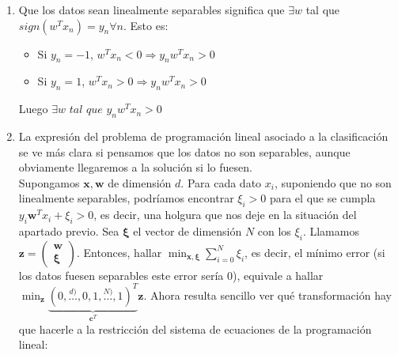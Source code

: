 \documentclass[11pt,leqno]{article}
\theoremstyle{definition}
\begin{document}
\begin{solucion} $\ $
\begin{enumerate}[a]
\item Que los datos sean linealmente separables significa que $\exists w$ tal que $sign(w^T x_n) = y_n \forall n$. Esto es:
\begin{itemize}
\item Si $y_n=-1$, $w^T x_n < 0 \Rightarrow y_n w^T x_n > 0$
\item Si $y_n= 1$, $w^T x_n > 0 \Rightarrow y_n w^T x_n > 0$
\end{itemize} 
Luego $\exists w \textit{ tal que } y_n w^T x_n > 0$

\item La expresión del problema de programación lineal asociado a la clasificación se ve más clara si pensamos que los datos no son separables, aunque obviamente llegaremos a la solución si lo fuesen.\\
Supongamos $\mathbf{x}, \mathbf{w}$ de dimensión $d$. Para cada dato $x_i$, suponiendo que no son linealmente separables, podríamos encontrar $\xi_i>0$ para el que se cumpla $y_i \mathbf{w}^T x_i + \xi_i>0$, es decir, una holgura que nos deje en la situación del apartado previo.
Sea $\mathbf{\xi}$ el vector de dimensión $N$ con los $\xi_i$. 
Llamamos $\mathbf{z} = \left( \begin{array}{c} \mathbf{w} \\ \mathbf{\xi} \end{array}\right)$. 
Entonces, hallar $\min_{\mathbf{x},\mathbf{\xi}} \sum_{i=0}^N \xi_i$, es decir, el mínimo error (si los datos fuesen separables este error sería 0), equivale a hallar $\min_\mathbf{z} \underbrace{(0,\overset{d)}{\dots},0,1,\overset{N)}{\dots},1)^T}_{\mathbf{c}^T} \mathbf{z}$. Ahora resulta sencillo ver qué transformación hay que hacerle a la restricción del sistema de ecuaciones de la programación lineal:


\end{enumerate}
\end{solucion}
\end{document}
